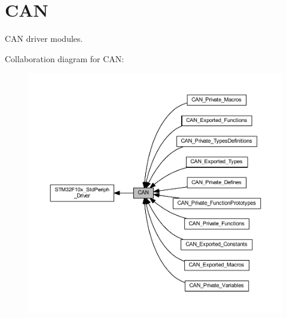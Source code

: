 \hypertarget{group___c_a_n}{}\section{C\+AN}
\label{group___c_a_n}


C\+AN driver modules.  


Collaboration diagram for C\+AN\+:
\nopagebreak
\begin{figure}[H]
\begin{center}
\leavevmode
\includegraphics[width=350pt]{group___c_a_n}
\end{center}
\end{figure}
